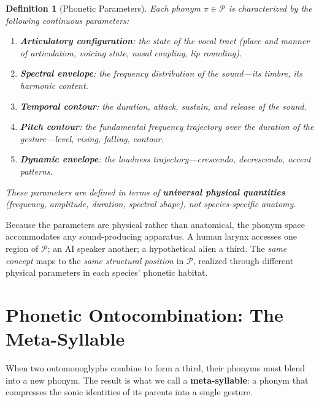 \documentclass[12pt, letterpaper]{book}
\newtheorem{definition}{Definition}[chapter]
\begin{document}
\begin{definition}[Phonetic Parameters]\label{def:phon-params}
Each phonym $\pi \in \mathcal{P}$ is characterized by the following continuous parameters:
\begin{enumerate}[label=(\roman*)]
    \item \textbf{Articulatory configuration}: the state of the vocal tract (place and manner of articulation, voicing state, nasal coupling, lip rounding).
    \item \textbf{Spectral envelope}: the frequency distribution of the sound---its timbre, its harmonic content.
    \item \textbf{Temporal contour}: the duration, attack, sustain, and release of the sound.
    \item \textbf{Pitch contour}: the fundamental frequency trajectory over the duration of the gesture---level, rising, falling, contour.
    \item \textbf{Dynamic envelope}: the loudness trajectory---crescendo, decrescendo, accent patterns.
\end{enumerate}
These parameters are defined in terms of \textbf{universal physical quantities} (frequency, amplitude, duration, spectral shape), not species-specific anatomy.
\end{definition}

Because the parameters are physical rather than anatomical, the phonym space accommodates any sound-producing apparatus. A human larynx accesses one region of $\mathcal{P}$; an AI speaker another; a hypothetical alien a third. The \textit{same concept} maps to the \textit{same structural position} in $\mathcal{P}$, realized through different physical parameters in each species' phonetic habitat.


\section{Phonetic Ontocombination: The Meta-Syllable}

When two ontomonoglyphs combine to form a third, their phonyms must blend into a new phonym. The result is what we call a \textbf{meta-syllable}: a phonym that compresses the sonic identities of its parents into a single gesture.
\end{document}

